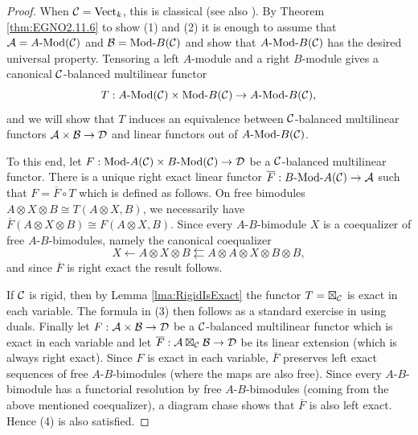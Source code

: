 \documentclass{amsart}
\begin{document}
\begin{proof}
	When $\mathcal C = \mathrm{Vect}_k$, this is classical \cite[Prop 5.13]{MR1106898} (see also \cite[Prop 1.46.2]{EGNO}).
	By Theorem \ref{thm:EGNO2.11.6} to show (1) and (2) it is enough to assume that $\cA = \Mod{A}{}(\cC)$ and $\cB = \Mod{}{B}(\cC)$ and show that $\Mod{A }{B}(\cC)$ has the desired universal property. Tensoring a left $A$-module and a right $B$-module gives a canonical $\mathcal C$-balanced multilinear functor 
		\begin{equation*}
			T: \Mod{A}{}(\cC) \times \Mod{}{B}(\cC) \to \Mod{A}{B}(\cC),  
		\end{equation*}
and we will show that $T$ induces an equivalence between $\mathcal C$-balanced multilinear functors $\mathcal A \times \mathcal B \to \mathcal D$ and linear functors out of $\Mod{A}{B}(\cC)$.
	
	To this end, let $F:\Mod{}{A}(\cC) \times \Mod{B}{}(\cC) \to \cD$ be a $\mathcal C$-balanced multilinear functor.  
	There is a unique right exact linear functor $\overline F: \Mod{B}{A}(\cC) \to \cA$ such that $F = \overline{F} \circ T$ which is defined as follows. On free bimodules $A \otimes X \otimes B \cong T(A \otimes X, B)$, we necessarily have $\overline{F}(A \otimes X \otimes B) \cong F(A \otimes X, B)$. Since  every $A$-$B$-bimodule $X$ is a coequalizer of free $A$-$B$-bimodules, namely the canonical coequalizer  
	\begin{equation*}
		X \leftarrow A \otimes X \otimes B \leftleftarrows A \otimes A \otimes X \otimes B \otimes B,
	\end{equation*}
	and since $\overline{F}$ is right exact the result follows.
	
	If $\mathcal C$ is rigid, then by Lemma \ref{lma:RigidIsExact} the functor $T = \boxtimes_{\mathcal C}$ is exact in each variable. The formula in (3) then follows as a standard exercise in using duals. Finally let $F: \mathcal A \times \mathcal B \to \mathcal D$ be a $\mathcal C$-balanced multilinear functor which is exact in each variable and let $\overline{F}: \mathcal A \boxtimes_\mathcal C \mathcal B \to \mathcal D$ be its linear extension (which is always right exact). Since $F$ is exact in each variable, $\overline{F}$ preserves left exact sequences of free $A$-$B$-bimodules (where the maps are also free). Since every $A$-$B$-bimodule has a functorial resolution by free $A$-$B$-bimodules (coming from the above mentioned coequalizer), a diagram chase shows that $\overline{F}$ is also left exact. Hence (4) is also satisfied. 
\end{proof}
\end{document}
